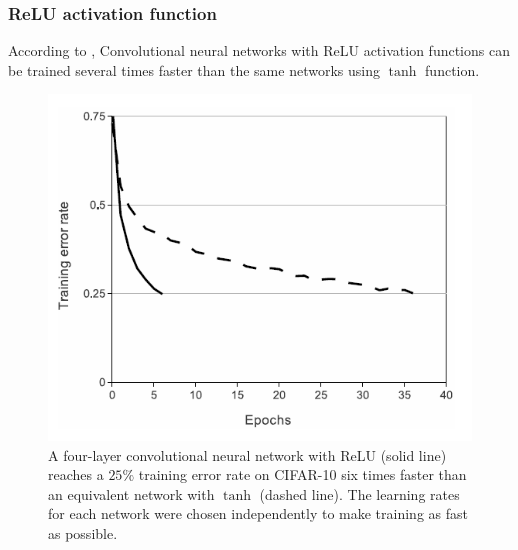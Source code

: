 \begin{frame}
	\frametitle{ReLU activation function}
	
	According to \cite{krizhevsky2012imagenet}, Convolutional neural networks with ReLU activation functions can be trained several times faster than the same networks using $\tanh$ function. 
	
	\medskip
	
	\begin{center}
		\begin{figure}
		\includegraphics[scale=0.75]{figs/Alexnet_reluVsTanh}
		\caption{A four-layer convolutional neural network with ReLU (solid line) reaches a $25\%$ training error rate on CIFAR-10 six times faster than an equivalent network with $\tanh$ (dashed line). The learning rates for each network were chosen independently to make training as fast as possible.}
		\end{figure}

	\end{center}

\end{frame}


